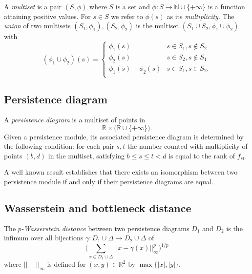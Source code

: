 \documentclass{amsart}
\begin{document}
	A \textit{multiset} is a pair $(S, \phi)$ where $S$ is a set and $\phi : S \to \mathbb N \cup \{+\infty\}$ is a function attaining positive values. For $s \in S$ we refer to $\phi(s)$ as its \textit{multiplicity}. The \textit{union} of two multisets $(S_1, \phi_1), (S_2, \phi_2)$ is the multiset $(S_1 \cup S_2, \phi_1 \cup \phi_2)$ with
	\begin{equation*}
	(\phi_1 \cup \phi_2)(s) = 
	\begin{cases}
	\phi_1(s) & s \in S_1, s \not\in S_2 \\
	\phi_2(s) & s \in S_2, s \not\in S_1 \\
	\phi_1(s) + \phi_2(s) & s \in S_1, s \in S_2. \\
	\end{cases}
	\end{equation*}
	
	\subsection*{Persistence diagram} \label{persistence_diagram}
	
	A \textit{persistence diagram} is a
	multiset of points in
	\begin{equation*}
	\mathbb R \times \big( \mathbb{R} \cup \{+\infty\} \big).
	\end{equation*}	
	Given a 
	persistence module, its associated persistence diagram is determined by the following condition: for each pair $s,t$ the number counted with multiplicity of points $(b,d)$ in the multiset, satisfying $b \leq s \leq t < d$ is equal to the rank of $f_{st}.$
	
	A well known result establishes that there exists an isomorphism between two persistence module if and only if their persistence diagrams are equal.
	
	\subsection*{Wasserstein and bottleneck distance}	\label{wasserstein_and_bottleneck_distance}
	
	The $p$\textit{-Wasserstein distance} between two persistence diagrams $D_1$ and $D_2$ is the infimum over all bijections $\gamma: D_1 \cup \Delta \to D_2 \cup \Delta$ of
	\begin{equation*}
	\Big(\sum_{x \in D_1 \cup \Delta} ||x - \gamma(x)||_\infty^p \Big)^{1/p}
	\end{equation*}
	where $||-||_\infty$ is defined for $(x,y) \in \mathbb R^2$ by $\max\{|x|, |y|\}$. 
	
\end{document}
